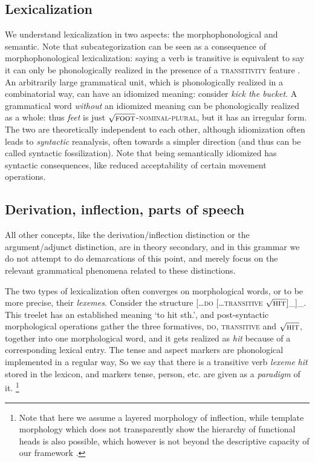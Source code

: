 \documentclass[UTF8, a4paper, oneside, scheme=plain, 12pt]{ctexrep}
\newcommand*{\term}[1]{\emph{#1}}
\newcommand{\form}[1]{\emph{#1}}
\newcommand{\translate}[1]{`#1'}
\newcommand*{\category}[1]{\textsc{#1}}
\newcommand*{\wordroot}[1]{$\sqrt{\text{\textsc{#1}}}$}
\begin{document}
{\subsection{Lexicalization}\label{sec:intro.theory.lexicon}

We understand lexicalization in two aspects:
the morphophonological and semantic.
Note that subcategorization can be seen as a consequence of morphophonological lexicalization:
saying a verb is transitive is equivalent to say it can only be phonologically realized
in the presence of a \category{transitivity} feature \citep{siddiqi2009syntax}.
An arbitrarily large grammatical unit,
which is phonologically realized in a combinatorial way, can have an idiomized meaning:
consider \form{kick the bucket}.
A grammatical word \emph{without} an idiomized meaning
can be phonologically realized as a whole:
thus \form{feet} is just \wordroot{foot}-\category{nominal}-\category{plural},
but it has an irregular form.
The two are theoretically independent to each other,
although idiomization often leads to \emph{syntactic} reanalysis,
often towards a simpler direction (and thus can be called syntactic fossilization). 
Note that being semantically idiomized has syntactic consequences,
like reduced acceptability of certain movement operations.

\subsection{Derivation, inflection, parts of speech}\label{sec:intro.theory.pos}

All other concepts, like the derivation/inflection distinction
or the argument/adjunct distinction, are in theory secondary,
and in this grammar we do not attempt to do demarcations of this point,
and merely focus on the relevant grammatical phenomena related to these distinctions.

The two types of lexicalization often converges on morphological words,
or to be more precise, their \emph{lexemes}.
Consider the structure [\dots \category{do} [\dots \category{transitive} \wordroot{hit}]_{}]_{}.
This treelet has an established meaning \translate{to hit sth.},
and post-syntactic morphological operations gather the three formatives,
\category{do}, \category{transitive} and \wordroot{hit}, together into one morphological word,
and it gets realized as \form{hit} because of a corresponding lexical entry.
The tense and aspect markers are phonological implemented in a regular way,
So we say that there is a transitive verb \term{lexeme} \form{hit} stored in the lexicon,
and markers tense, person, etc. are given as a \term{paradigm} of it.%
\footnote{
    Note that here we assume a layered morphology of inflection,
    while template morphology which does not transparently show the hierarchy of functional heads
    is also possible, which however is not beyond the descriptive capacity of our framework
    \citep{bye2020morpheme}.
}

}
\end{document}
